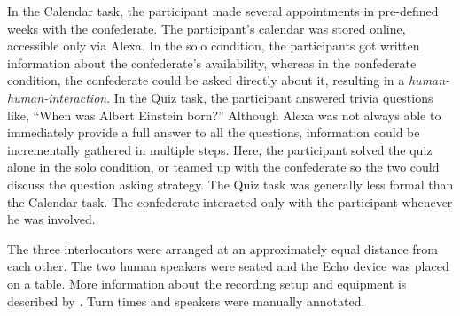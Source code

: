 In the Calendar task, the participant made several appointments in pre-defined weeks with the confederate.
The participant's calendar was stored online, accessible only via Alexa.
In the solo condition, the participants got written information about the confederate's availability, whereas in the confederate condition, the confederate could be asked directly about it, resulting in a \emph{human-human-interaction}.
In the Quiz task, the participant answered trivia questions like, \enquote{When was Albert Einstein born?}
Although Alexa was not always able to immediately provide a full answer to all the questions, information could be incrementally gathered in multiple steps.
Here, the participant solved the quiz alone in the solo condition, or teamed up with the confederate so the two could discuss the question asking strategy.
The Quiz task was generally less formal than the Calendar task.
The confederate interacted only with the participant whenever he was involved.

The three interlocutors were arranged at an approximately equal distance from each other.
The two human speakers were seated and the Echo device was placed on a table.
More information about the recording setup and equipment is described by \citet{Siegert2018VACC}.
Turn times and speakers were manually annotated.

% 


